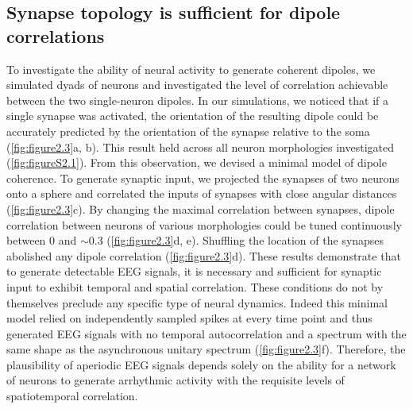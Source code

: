 \subsection{Synapse topology is sufficient for dipole correlations}
To investigate the ability of neural activity to generate coherent dipoles, we simulated dyads of neurons and investigated the level of correlation achievable between the two single-neuron dipoles. In our simulations, we noticed that if a single synapse was activated, the orientation of the resulting dipole could be accurately predicted by the orientation of the synapse relative to the soma (\autoref{fig:figure2.3}a, b). This result held across all neuron morphologies investigated (\autoref{fig:figureS2.1}). From this observation, we devised a minimal model of dipole coherence. To generate synaptic input, we projected the synapses of two neurons onto a sphere and correlated the inputs of synapses with close angular distances (\autoref{fig:figure2.3}c). By changing the maximal correlation between synapses, dipole correlation between neurons of various morphologies could be tuned continuously between 0 and ${\sim}0.3$ (\autoref{fig:figure2.3}d, e). Shuffling the location of the synapses abolished any dipole correlation (\autoref{fig:figure2.3}d). These results demonstrate that to generate detectable EEG signals, it is necessary and sufficient for synaptic input to exhibit temporal and spatial correlation. These conditions do not by themselves preclude any specific type of neural dynamics. Indeed this minimal model relied on independently sampled spikes at every time point and thus generated EEG signals with no temporal autocorrelation and a spectrum with the same shape as the asynchronous unitary spectrum (\autoref{fig:figure2.3}f). Therefore, the plausibility of aperiodic EEG signals depends solely on the ability for a network of neurons to generate arrhythmic activity with the requisite levels of spatiotemporal correlation. 

